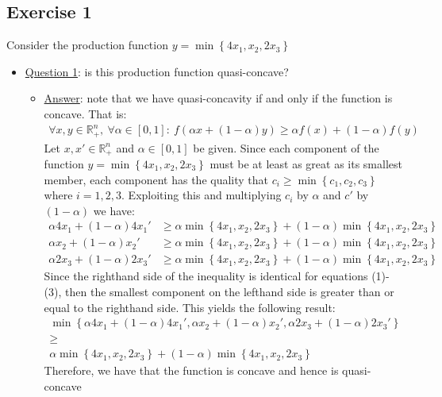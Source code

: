\documentclass{article}
\begin{document}
\subsection{Exercise 1}
Consider the production function $y = \min \left\{ 4x_{1}, x_{2}, 2x_{3} \right\}$ \par \vspace{0.3em}
  \begin{itemize}
    \item  \underline{Question 1}: is this production function quasi-concave?
    \begin{itemize}
      \item  \underline{Answer}: note that we have quasi-concavity if and only if the function is concave. That is:
      \begin{gather*}
        \forall x,y \in \mathbb{R}^{n}_{+}, \ \forall \alpha \in [0,1]: \ f(\alpha x + (1- \alpha)y) \geq \alpha f(x) + (1-\alpha)f(y)
      \end{gather*}
      Let $x, x' \in \mathbb{R}^{n}_{+}$ and $\alpha \in [0,1]$ be given. Since each component of the function $y = \min \left\{ 4x_{1}, x_{2}, 2x_{3} \right\}$ must be at least as great as its smallest member, each component has the quality that $c_{i} \geq \min \left\{ c_{1}, c_{2}, c_{3} \right\}$ where $i = 1, 2, 3$. Exploiting this and multiplying $c_{i}$ by $\alpha$ and $c'$ by $(1-\alpha)$ we have:
      \begin{align*}
        \alpha 4x_{1} + (1-\alpha)4x_{1}' &\geq \alpha \min \left\{ 4x_{1}, x_{2}, 2x_{3} \right\} + (1-\alpha) \min \left\{ 4x_{1}, x_{2}, 2x_{3} \right\} \ \tag{1} \\
        \alpha x_{2} + (1-\alpha)x_{2}' &\geq \alpha \min \left\{ 4x_{1}, x_{2}, 2x_{3} \right\} + (1-\alpha) \min \left\{ 4x_{1}, x_{2}, 2x_{3} \right\} \ \tag{2} \\
        \alpha 2x_{3} + (1-\alpha)2x_{3}' &\geq \alpha \min \left\{ 4x_{1}, x_{2}, 2x_{3} \right\} + (1-\alpha)\min \left\{ 4x_{1}, x_{2}, 2x_{3} \right\}
      \end{align*}
      Since the righthand side of the inequality is identical for equations (1)-(3), then the smallest component on the lefthand side is greater than or equal to the righthand side. This yields the following result:
      \begin{gather*}
        \min \left\{ \alpha 4x_{1} + (1-\alpha)4x_{1}', \alpha x_{2} + (1-\alpha) x_{2}', \alpha 2x_{3} + (1-\alpha)2x_{3}' \right\} \\
        \geq \\
        \alpha \min \left\{ 4x_{1}, x_{2}, 2x_{3} \right\} + (1-\alpha) \min \left\{ 4x_{1}, x_{2}, 2x_{3} \right\}
      \end{gather*}
      Therefore, we have that the function is concave and hence is quasi-concave
    \end{itemize}
  \end{itemize}
\end{document}
